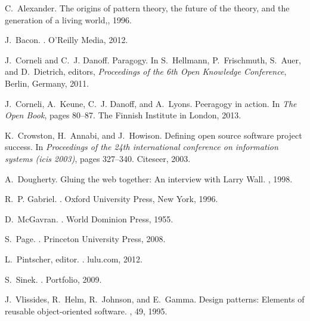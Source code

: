\documentclass{acm_proc_article-sp}
\begin{document}
\begin{thebibliography}{10}

C.~Alexander.
\newblock The origins of pattern theory, the future of the theory, and the
  generation of a living world,, 1996.

J.~Bacon.
.
\newblock O'Reilly Media, 2012.

J.~Corneli and C.~J. Danoff.
\newblock Paragogy.
\newblock In S.~Hellmann, P.~Frischmuth, S.~Auer, and D.~Dietrich, editors,
  {\em Proceedings of the 6th Open Knowledge Conference}, Berlin, Germany,
  2011.

J.~Corneli, A.~Keune, C.~J. Danoff, and A.~Lyons.
\newblock Peeragogy in action.
\newblock In {\em The Open Book}, pages 80--87. The Finnish Institute in
  London, 2013.

K.~Crowston, H.~Annabi, and J.~Howison.
\newblock Defining open source software project success.
\newblock In {\em Proceedings of the 24th international conference on
  information systems (icis 2003)}, pages 327--340. Citeseer, 2003.

A.~Dougherty.
\newblock Gluing the web together: An interview with {L}arry {W}all.
, 1998.

R.~P. Gabriel.
.
\newblock Oxford University Press, New York, 1996.

D.~McGavran.
.
\newblock World Dominion Press, 1955.

S.~Page.
.
\newblock Princeton University Press, 2008.

L.~Pintscher, editor.
.
\newblock lulu.com, 2012.

S.~Sinek.
.
\newblock Portfolio, 2009.

J.~Vlissides, R.~Helm, R.~Johnson, and E.~Gamma.
\newblock Design patterns: Elements of reusable object-oriented software.
, 49, 1995.

\end{thebibliography}
\end{document}

